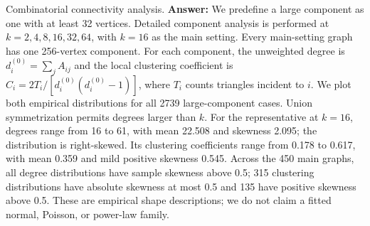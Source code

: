 \item Combinatorial connectivity analysis.
{\color{blue}\textbf{Answer:}
We predefine a large component as one with at least 32 vertices.
Detailed component analysis is performed at $k=2,4,8,16,32,64$, with $k=16$
as the main setting. Every main-setting graph has one 256-vertex component.
For each component, the unweighted degree is $d_i^{(0)}=\sum_j A_{ij}$ and
the local clustering coefficient is
$C_i=2T_i/[d_i^{(0)}(d_i^{(0)}-1)]$, where $T_i$ counts triangles incident
to $i$. We plot both empirical distributions for all 2739 large-component cases.
Union symmetrization permits degrees larger than $k$.
For the representative at $k=16$, degrees range from 16
to 61, with mean 22.508
and skewness 2.095; the distribution is right-skewed.
Its clustering coefficients range from 0.178
to 0.617, with mean
0.359 and mild positive skewness
0.545.
Across the 450 main graphs, all degree distributions have sample skewness above 0.5;
315 clustering distributions have absolute skewness at most 0.5 and 135 have
positive skewness above 0.5. These are empirical shape descriptions;
we do not claim a fitted normal, Poisson, or power-law family.
}


